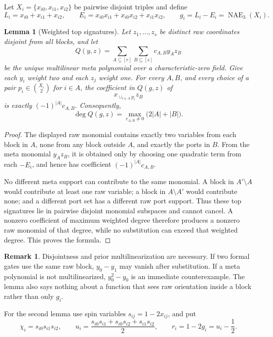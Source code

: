 \documentclass[11pt]{article}
\newtheorem{lemma}[theorem]{Lemma}
\theoremstyle{definition}
\newtheorem{remark}[theorem]{Remark}
\newcommand{\NAE}{\operatorname{NAE}}
\begin{document}
Let \(X_i=\{x_{i0},x_{i1},x_{i2}\}\) be pairwise disjoint triples and define
\[
 L_i=x_{i0}+x_{i1}+x_{i2},\qquad
 E_i=x_{i0}x_{i1}+x_{i0}x_{i2}+x_{i1}x_{i2},\qquad
 g_i=L_i-E_i=\NAE_3(X_i).
\]

\begin{lemma}[Weighted top signatures]\label{lem:weighted-signature}
Let \(z_1,\ldots,z_s\) be distinct raw coordinates disjoint from all blocks,
and let
\[
 Q(y,z)=\sum_{A\subseteq[r]}\sum_{B\subseteq[s]}
 c_{A,B}y_Az_B
\]
be the unique multilinear meta polynomial over a characteristic-zero field.
Give each \(y_i\) weight two and each \(z_j\) weight one.  For every
\(A,B\), and every choice of a pair \(p_i\in\binom{X_i}{2}\) for \(i\in A\),
the coefficient in \(Q(g,z)\) of
\[
 x_{\cup_{i\in A}p_i}z_B
\]
is exactly \((-1)^{|A|}c_{A,B}\).  Consequently,
\[
 \deg Q(g,z)=\max_{c_{A,B}\ne0}\bigl(2|A|+|B|\bigr).
\]
\end{lemma}

\begin{proof}
The displayed raw monomial contains exactly two variables from each block in
\(A\), none from any block outside \(A\), and exactly the ports in \(B\).  From
the meta monomial \(y_Az_B\), it is obtained only by choosing one quadratic
term from each \(-E_i\), and hence has coefficient
\((-1)^{|A|}c_{A,B}\).

No different meta support can contribute to the same monomial.  A block in
\(A'\setminus A\) would contribute at least one raw variable; a block in
\(A\setminus A'\) would contribute none; and a different port set has a
different raw port support.  Thus these top signatures lie in pairwise disjoint
monomial subspaces and cannot cancel.  A nonzero coefficient of maximum
weighted degree therefore produces a nonzero raw monomial of that degree,
while no substitution can exceed that weighted degree.  This proves the
formula.
\end{proof}

\begin{remark}
Disjointness and prior multilinearization are necessary.  If two formal gates
use the same raw block, \(y_0-y_1\) may vanish after substitution.  If a meta
polynomial is not multilinearized, \(y_0^2-y_0\) is an immediate counterexample.
The lemma also says nothing about a function that sees raw orientation inside a
block rather than only \(g_i\).
\end{remark}

For the second lemma use spin variables \(s_{ij}=1-2x_{ij}\), and put
\[
 \chi_i=s_{i0}s_{i1}s_{i2},\qquad
 u_i=\frac{s_{i0}s_{i1}+s_{i0}s_{i2}+s_{i1}s_{i2}}2,
 \qquad r_i=1-2g_i=u_i-\frac12.
\]
\end{document}
